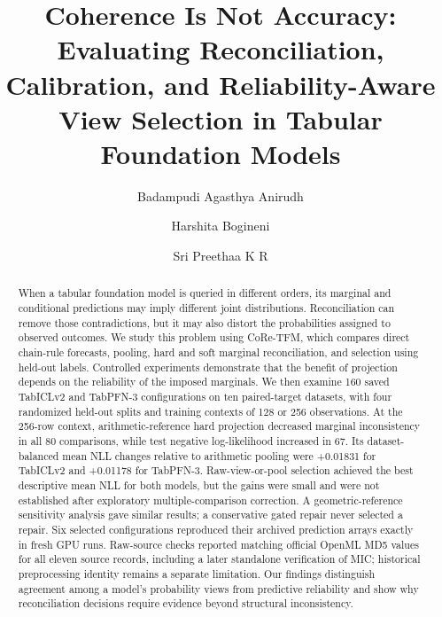 \documentclass[a4paper,fleqn]{cas-sc}
\begin{document}
\title[mode=title]{Coherence Is Not Accuracy: Evaluating Reconciliation, Calibration, and Reliability-Aware View Selection in Tabular Foundation Models}

\author[vit]{Badampudi Agasthya Anirudh}
\author[vit]{Harshita Bogineni}
\author[vit]{Sri Preethaa K R}
\cormark[1]

\begin{abstract}
When a tabular foundation model is queried in different orders, its marginal and conditional predictions may imply different joint distributions. Reconciliation can remove those contradictions, but it may also distort the probabilities assigned to observed outcomes. We study this problem using CoRe-TFM, which compares direct chain-rule forecasts, pooling, hard and soft marginal reconciliation, and selection using held-out labels. Controlled experiments demonstrate that the benefit of projection depends on the reliability of the imposed marginals. We then examine 160 saved TabICLv2 and TabPFN-3 configurations on ten paired-target datasets, with four randomized held-out splits and training contexts of 128 or 256 observations. At the 256-row context, arithmetic-reference hard projection decreased marginal inconsistency in all 80 comparisons, while test negative log-likelihood increased in 67. Its dataset-balanced mean NLL changes relative to arithmetic pooling were +0.01831 for TabICLv2 and +0.01178 for TabPFN-3. Raw-view-or-pool selection achieved the best descriptive mean NLL for both models, but the gains were small and were not established after exploratory multiple-comparison correction. A geometric-reference sensitivity analysis gave similar results; a conservative gated repair never selected a repair. Six selected configurations reproduced their archived prediction arrays exactly in fresh GPU runs. Raw-source checks reported matching official OpenML MD5 values for all eleven source records, including a later standalone verification of MIC; historical preprocessing identity remains a separate limitation. Our findings distinguish agreement among a model's probability views from predictive reliability and show why reconciliation decisions require evidence beyond structural inconsistency.
\end{abstract}
\end{document}

